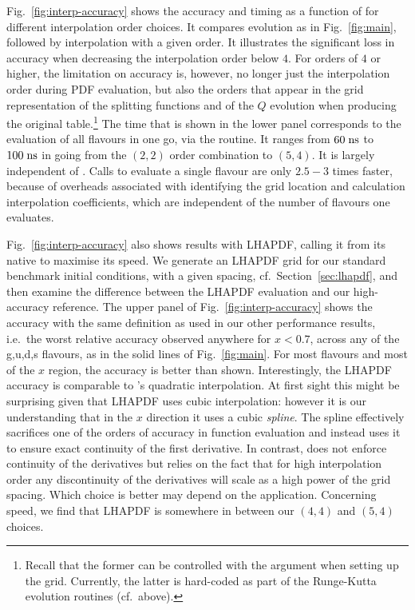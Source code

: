 Fig.~\ref{fig:interp-accuracy} shows the accuracy and timing as a
function of  for different interpolation order choices.
%
It compares evolution as in Fig.~\ref{fig:main}, followed by
interpolation with a given order.
%
It illustrates the significant loss in accuracy when decreasing
the interpolation order below $4$.
%
For orders of $4$ or higher, the limitation on accuracy is, however,
no longer just the interpolation order during PDF evaluation, but also
the orders that appear in the grid representation of the splitting
functions and of the $Q$ evolution when producing the original
table.\footnote{Recall that the former can be controlled with the
   argument when setting up the grid.
  Currently, the latter is hard-coded as part of the Runge-Kutta
  evolution routines (cf.\ above).
}
%
The time that is shown in the lower panel corresponds to the
evaluation of all flavours in one go, via the
 routine.
%
It ranges from $60\;\mathrm{ns}$ to $100\;\mathrm{ns}$ in going from the $(2,2)$ order
combination to $(5,4)$.
%
It is largely independent of .
%
Calls to evaluate a single flavour are only $2.5{-}3$ times faster,
because of overheads associated with identifying the grid location and
calculation interpolation coefficients, which are independent of the
number of flavours one evaluates.


Fig.~\ref{fig:interp-accuracy} also shows results with LHAPDF, calling
it from its native \CPP to maximise its speed.
%
We generate an LHAPDF grid for our standard benchmark initial
conditions, with a given  spacing, cf.\
Section~\ref{sec:lhapdf}, and then examine the difference between the
LHAPDF evaluation and our high-accuracy reference.
%
The upper panel of Fig.~\ref{fig:interp-accuracy} shows the accuracy
with the same definition as used in our other performance results,
i.e.\ the worst relative accuracy observed anywhere for $x < 0.7$,
across any of the g,u,d,s flavours, as in the solid lines of
Fig.~\ref{fig:main}.
%
For most flavours and most of the $x$ region, the accuracy is better
than shown.
%
Interestingly, the LHAPDF accuracy is comparable to \hoppet's
quadratic interpolation.
%
At first sight this might be surprising given that LHAPDF uses cubic
interpolation: however it is our understanding that in the $x$
direction it uses a cubic \emph{spline}.
%
The spline effectively sacrifices one of the orders of accuracy in
function evaluation and instead uses it to ensure exact continuity of
the first derivative.
%
In contrast, \hoppet does not enforce continuity of the derivatives
but relies on the fact that for high interpolation order any
discontinuity of the derivatives will scale as a high power of the
grid spacing. 
%
Which choice is better may depend on the application. 
%
Concerning speed, we find that LHAPDF is somewhere in between our
$(4,4)$ and $(5,4)$ choices.

